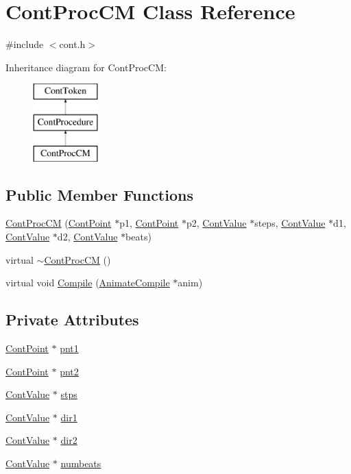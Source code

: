 \hypertarget{a00064}{\section{Cont\-Proc\-C\-M Class Reference}
\label{a00064}
}


{\ttfamily \#include $<$cont.\-h$>$}

Inheritance diagram for Cont\-Proc\-C\-M\-:\begin{figure}[H]
\begin{center}
\leavevmode
\includegraphics[height=3.000000cm]{a00064}
\end{center}
\end{figure}
\subsection*{Public Member Functions}
\begin{DoxyCompactItemize}
\item 
\hyperlink{a00064_ac6b4592fce2ad41d07d94aa8e14a22ba}{Cont\-Proc\-C\-M} (\hyperlink{a00062}{Cont\-Point} $\ast$p1, \hyperlink{a00062}{Cont\-Point} $\ast$p2, \hyperlink{a00086}{Cont\-Value} $\ast$steps, \hyperlink{a00086}{Cont\-Value} $\ast$d1, \hyperlink{a00086}{Cont\-Value} $\ast$d2, \hyperlink{a00086}{Cont\-Value} $\ast$beats)
\item 
virtual \hyperlink{a00064_a5cfc324ae4649adab5e256a5e0ea8096}{$\sim$\-Cont\-Proc\-C\-M} ()
\item 
virtual void \hyperlink{a00064_ae3d0ef74c8e17080072c537f29c17519}{Compile} (\hyperlink{a00007}{Animate\-Compile} $\ast$anim)
\end{DoxyCompactItemize}
\subsection*{Private Attributes}
\begin{DoxyCompactItemize}
\item 
\hyperlink{a00062}{Cont\-Point} $\ast$ \hyperlink{a00064_ab26de80a5d39bbc258c2f1a0c891e019}{pnt1}
\item 
\hyperlink{a00062}{Cont\-Point} $\ast$ \hyperlink{a00064_aac5833fb80c9a5413aca7cbbda125a2c}{pnt2}
\item 
\hyperlink{a00086}{Cont\-Value} $\ast$ \hyperlink{a00064_a5c5d9e8f0709600e603d41d1840bb134}{stps}
\item 
\hyperlink{a00086}{Cont\-Value} $\ast$ \hyperlink{a00064_abbb93432c6a51264b680e9971dfe2d21}{dir1}
\item 
\hyperlink{a00086}{Cont\-Value} $\ast$ \hyperlink{a00064_a9ca842f12168d7910db6f009005640e6}{dir2}
\item 
\hyperlink{a00086}{Cont\-Value} $\ast$ \hyperlink{a00064_a196f9549aa5ec6e90fd0abe2940196a1}{numbeats}
\end{DoxyCompactItemize}
